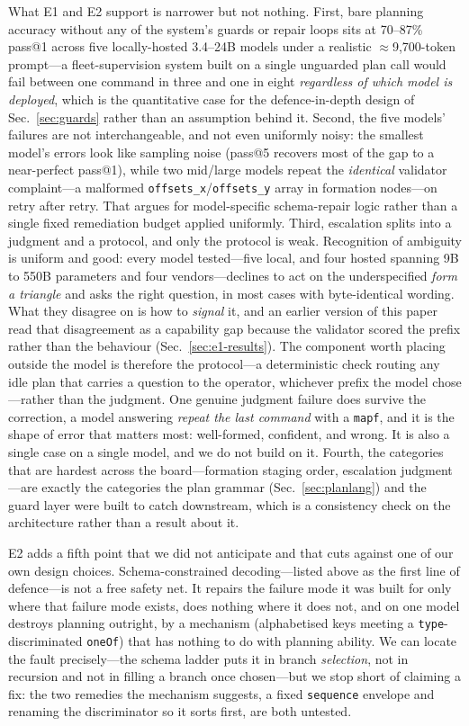 \documentclass[10pt,twocolumn]{article}
\newcommand{\code}[1]{\texttt{\small #1}}
\begin{document}
What E1 and E2 support is narrower but not nothing. First, bare planning
accuracy without any of the system's guards or repair loops sits at
70--87\% pass@1 across five locally-hosted 3.4--24B models under a realistic
$\approx$9{,}700-token prompt---a fleet-supervision system built on a single
unguarded plan call would fail between one command in three and one in eight
\emph{regardless of which model is deployed}, which is the quantitative case
for the defence-in-depth design of Sec.~\ref{sec:guards} rather than an
assumption behind it. Second, the five models' failures are not
interchangeable, and not even uniformly noisy: the smallest model's errors
look like sampling noise (pass@5 recovers most of the gap to a near-perfect
pass@1), while two mid/large models repeat the \emph{identical} validator
complaint---a malformed \code{offsets\_x}/\code{offsets\_y} array in
formation nodes---on retry after retry. That argues for model-specific
schema-repair logic rather than a single fixed remediation budget applied
uniformly. Third, escalation splits into a judgment and a protocol, and only
the protocol is weak. Recognition of ambiguity is uniform and good: every
model tested---five local, and four hosted spanning 9B to 550B parameters and
four vendors---declines to act on the underspecified \emph{form a triangle}
and asks the right question, in most cases with byte-identical wording. What
they disagree on is how to \emph{signal} it, and an earlier version of this
paper read that disagreement as a capability gap because the validator scored
the prefix rather than the behaviour (Sec.~\ref{sec:e1-results}). The
component worth placing outside the model is therefore the protocol---a
deterministic check routing any idle plan that carries a question to the
operator, whichever prefix the model chose---rather than the judgment. One
genuine judgment failure does survive the correction, a model answering
\emph{repeat the last command} with a \code{mapf}, and it is the shape of
error that matters most: well-formed, confident, and wrong. It is also a
single case on a single model, and we do not build on it. Fourth, the
categories that are hardest across the board---formation staging order,
escalation judgment---are exactly the categories the plan grammar
(Sec.~\ref{sec:planlang}) and the guard layer were built to catch
downstream, which is a consistency check on the architecture rather than a
result about it.

E2 adds a fifth point that we did not anticipate and that cuts against one of
our own design choices. Schema-constrained decoding---listed above as the
first line of defence---is not a free safety net. It repairs the failure mode
it was built for only where that failure mode exists, does nothing where it
does not, and on one model destroys planning outright, by a mechanism
(alphabetised keys meeting a \code{type}-discriminated \code{oneOf}) that has
nothing to do with planning ability. We can locate the fault
precisely---the schema ladder puts it in branch \emph{selection}, not in
recursion and not in filling a branch once chosen---but we stop short of
claiming a fix: the two remedies the mechanism suggests, a fixed
\code{sequence} envelope and renaming the discriminator so it sorts first, are
both untested.
\end{document}
